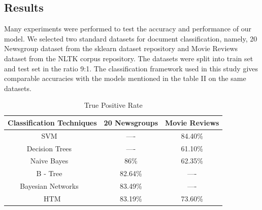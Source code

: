 \documentclass[12pt]{article}
\begin{document}
\begin{multicols}{2}
\subsection{Results}
Many experiments were performed to test the accuracy and performance of our model. We selected two standard datasets for document classification, namely, 20 Newsgroup dataset from the sklearn dataset repository and Movie Reviews dataset from the NLTK corpus repository. The datasets were
split into train set and test set in the ratio 9:1. The classification
framework used in this study gives comparable accuracies with the models mentioned in the table II on the same datasets.
\end{multicols}
\begin{table}[h]
\begin{center}
\caption{True Positive Rate}
\begin{tabular}{|c|c|c|}
\hline
Classification Techniques & 20 Newsgroups & Movie Reviews\\
\hline
SVM ~\cite{14} & ---- & 84.40\%\\
\hline
Decision Trees ~\cite{15} & ---- & 61.10\%\\
\hline
Naive Bayes ~\cite{16,17} & 86\% & 62.35\%\\
\hline
B - Tree ~\cite{18} & 82.64\% & ----\\
\hline
Bayesian Networks ~\cite{19}& 83.49\% & ----\\
\hline
HTM & 83.19\% & 73.60\%\\
\hline
\end{tabular}
\end{center}
\end{table}
\end{document}
